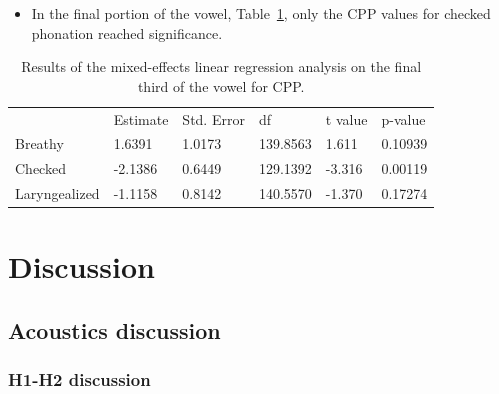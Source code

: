 \documentclass[12pt, letterpaper]{article}
\providecommand{\lsptoprule}{\midrule\toprule}
\providecommand{\lspbottomrule}{\bottomrule\midrule}
\begin{document}
\begin{itemize}
	\item In the final portion of the vowel, Table~\ref{tab:CPP_Third}, only the CPP values for checked phonation reached significance.
\end{itemize}

\begin{table}[!h]
	\centering
	\caption{Results of the mixed-effects linear regression analysis on the final third of the vowel for CPP. }
	\label{tab:CPP_Third}
	 \begin{tabular}{llllll}
	  \lsptoprule
						&  Estimate  & Std. Error & df & t value & p-value \\
	  	Breathy   		&  1.6391   &  1.0173  & 139.8563 &  1.611 & 0.10939 \\
		Checked    		& -2.1386   &  0.6449  & 129.1392 & -3.316 & 0.00119 \\
		Laryngealized	& -1.1158   &  0.8142  & 140.5570 & -1.370 & 0.17274\\
	  \lspbottomrule
	 \end{tabular}
\end{table}

\section{Discussion} \label{sec:Discussion}

\subsection{Acoustics discussion} \label{sec:Acoustics}

\subsubsection{H1-H2 discussion} \label{sec:DiscH1H2}
\end{document}
